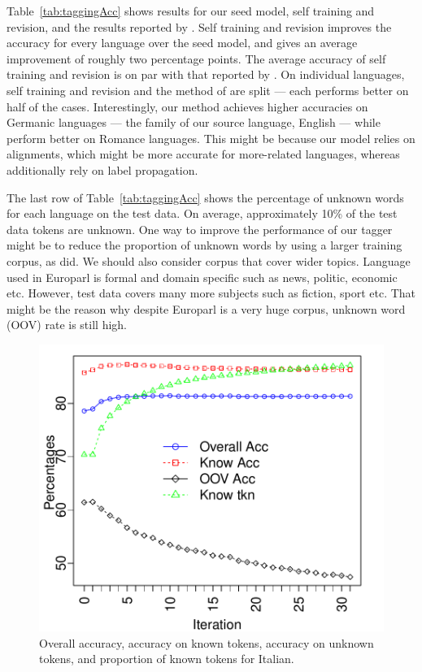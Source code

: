 Table~\ref{tab:taggingAcc} shows results for our seed model, self
training and revision, and the results reported by
\citeauthor{Das:2011}. Self training and revision improves the
accuracy for every language over the seed model, and gives an average
improvement of roughly two percentage points. The average accuracy of
self training and revision is on par with that reported by
\citeauthor{Das:2011}. On individual languages, self training and
revision and the method of \citeauthor{Das:2011} are split --- each
performs better on half of the cases. Interestingly, our method
achieves higher accuracies on Germanic languages --- the family of our
source language, English --- while \citeauthor{Das:2011} perform
better on Romance languages. This might be because our model relies on
alignments, which might be more accurate for more-related languages,
whereas \citeauthor{Das:2011} additionally rely on label propagation.

The last row of Table~\ref{tab:taggingAcc} shows the percentage of
unknown words for each language on the test data. On average,
approximately 10\% of the test data tokens are unknown. One way to
improve the performance of our tagger might be to reduce the
proportion of unknown words by using a larger training corpus, as
\citeauthor{Das:2011} did. We should also consider corpus that cover wider topics. Language used in Europarl is formal and domain specific such as news, politic, economic etc. However, test data covers many more subjects such as fiction, sport etc. That might be the reason why despite Europarl is a very huge corpus, unknown word (OOV) rate is still high. 


 \begin{figure}
 \centering
 \includegraphics[scale=0.7]{Figures/itAcc}
 \caption{Overall accuracy, accuracy on known tokens, accuracy on
   unknown tokens, and proportion of known tokens for Italian.}
 \label{fig:italian}
 \end{figure}

